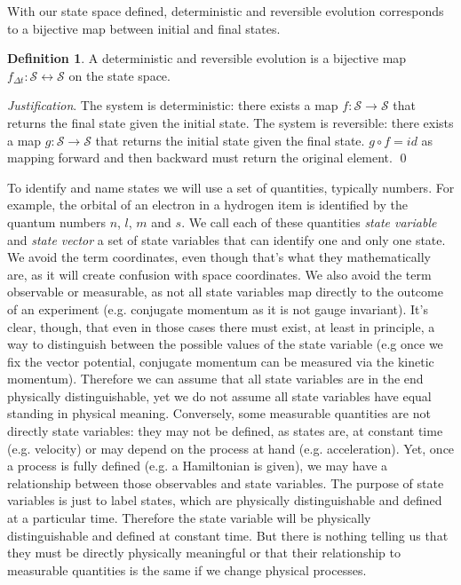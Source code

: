 \documentclass[aps,pra,10pt,twocolumn,floatfix,nofootinbib]{revtex4-1}
\theoremstyle{definition}
\newtheorem{defn}[prop]{Definition}
\newenvironment{justification}{\emph{Justification}.}{\qed}
\begin{document}
With our state space defined, deterministic and reversible evolution corresponds to a bijective map between initial and final states.

\begin{defn}\label{detrevmap}
A deterministic and reversible evolution is a bijective map $f_{\Delta t}:\mathcal{S} \leftrightarrow \mathcal{S}$ on the state space.
\end{defn}

\begin{justification}
The system is deterministic: there exists a map $f:\mathcal{S} \rightarrow \mathcal{S}$ that returns the final state given the initial state. The system is reversible: there exists a map $g:\mathcal{S} \rightarrow \mathcal{S}$ that returns the initial state given the final state. $g \circ f = id$ as mapping forward and then backward must return the original element.
\end{justification}

To identify and name states we will use a set of quantities, typically numbers. For example, the orbital of an electron in a hydrogen item is identified by the quantum numbers $n$, $l$, $m$ and $s$. We call each of these quantities \emph{state variable} and \emph{state vector} a set of state variables that can identify one and only one state. We avoid the term coordinates, even though that's what they mathematically are, as it will create confusion with space coordinates. We also avoid the term observable or measurable, as not all state variables map directly to the outcome of an experiment (e.g. conjugate momentum as it is not gauge invariant). It's clear, though, that even in those cases there must exist, at least in principle, a way to distinguish between the possible values of the state variable (e.g once we fix the vector potential, conjugate momentum can be measured via the kinetic momentum). Therefore we can assume that all state variables are in the end physically distinguishable, yet we do not assume all state variables have equal standing in physical meaning. Conversely, some measurable quantities are not directly state variables: they may not be defined, as states are, at constant time (e.g. velocity) or may depend on the process at hand (e.g. acceleration). Yet, once a process is fully defined (e.g. a Hamiltonian is given), we may have a relationship between those observables and state variables. The purpose of state variables is just to label states, which are physically distinguishable and defined at a particular time. Therefore the state variable will be physically distinguishable and defined at constant time. But there is nothing telling us that they must be directly physically meaningful or that their relationship to measurable quantities is the same if we change physical processes.
\end{document}
